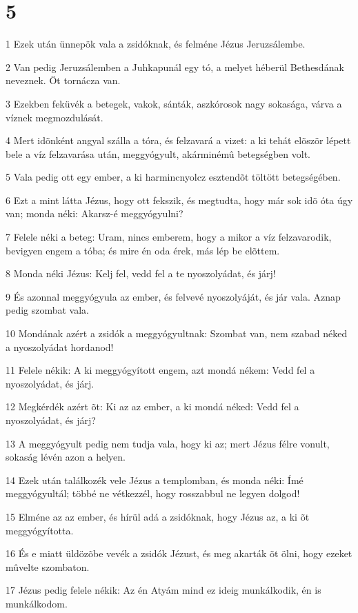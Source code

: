 \chapter{5}

\par 1 Ezek után ünnepök vala a zsidóknak, és felméne Jézus Jeruzsálembe.
\par 2 Van pedig Jeruzsálemben a Juhkapunál egy tó, a melyet héberül Bethesdának neveznek. Öt tornácza van.
\par 3 Ezekben feküvék a betegek, vakok, sánták, aszkórosok nagy sokasága, várva a víznek megmozdulását.
\par 4 Mert idõnként angyal szálla a tóra, és felzavará a vizet: a ki tehát elõször lépett bele a víz felzavarása után, meggyógyult, akárminémû betegségben volt.
\par 5 Vala pedig ott egy ember, a ki harmincnyolcz esztendõt töltött betegségében.
\par 6 Ezt a mint látta Jézus, hogy ott fekszik, és megtudta, hogy már sok idõ óta úgy van; monda néki: Akarsz-é meggyógyulni?
\par 7 Felele néki a beteg: Uram, nincs emberem, hogy a mikor a víz felzavarodik, bevigyen engem a tóba; és mire én oda érek, más lép be elõttem.
\par 8 Monda néki Jézus: Kelj fel, vedd fel a te nyoszolyádat, és járj!
\par 9 És azonnal meggyógyula az ember, és felvevé nyoszolyáját, és jár vala. Aznap pedig szombat vala.
\par 10 Mondának azért a zsidók a meggyógyultnak: Szombat van, nem szabad néked a nyoszolyádat hordanod!
\par 11 Felele nékik: A ki meggyógyított engem, azt mondá nékem: Vedd fel a nyoszolyádat, és járj.
\par 12 Megkérdék azért õt: Ki az az ember, a ki mondá néked: Vedd fel a nyoszolyádat, és járj?
\par 13 A meggyógyult pedig nem tudja vala, hogy ki az; mert Jézus félre vonult, sokaság lévén azon a helyen.
\par 14 Ezek után találkozék vele Jézus a templomban, és monda néki: Ímé meggyógyultál; többé ne vétkezzél, hogy  rosszabbul ne legyen dolgod!
\par 15 Elméne az az ember, és hírül adá a zsidóknak, hogy Jézus az, a ki õt meggyógyította.
\par 16 És e miatt üldözõbe vevék a zsidók Jézust, és meg akarták õt ölni, hogy ezeket mûvelte szombaton.
\par 17 Jézus pedig felele nékik: Az én Atyám mind ez ideig munkálkodik, én is munkálkodom.
